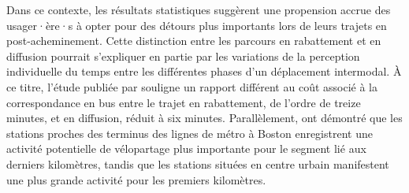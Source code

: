 \begin{refsegment}
Dans ce contexte, les résultats statistiques suggèrent une propension accrue des usager·ère·s à opter pour des détours plus importants lors de leurs trajets en post-acheminement. Cette distinction entre les parcours en rabattement et en diffusion pourrait s'expliquer en partie par les variations de la \gls{perception} individuelle du temps entre les différentes phases d'un déplacement intermodal. À ce titre, l'étude publiée par \textcolor{blue}{\textcite[79]{schakenbos_valuation_2016}} souligne un rapport différent au coût associé à la correspondance en bus entre le trajet en rabattement, de l'ordre de treize minutes, et en diffusion, réduit à six minutes. Parallèlement, \textcolor{blue}{\textcite[3]{romm_differences_2022}} ont démontré que les stations proches des terminus des lignes de métro à Boston enregistrent une activité potentielle de vélopartage plus importante pour le segment lié aux derniers kilomètres, tandis que les stations situées en centre urbain manifestent une plus grande activité pour les premiers kilomètres.%


\end{refsegment}
